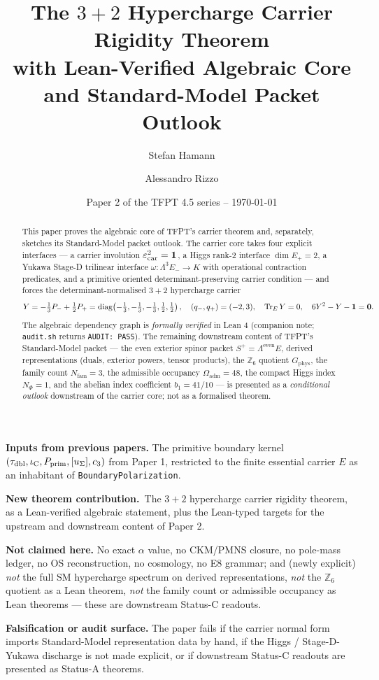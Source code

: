\documentclass[11pt,a4paper]{article}
\title{\color{tfptblue}\textbf{The $3+2$ Hypercharge Carrier Rigidity Theorem}\\[0.35em]
{\Large with Lean-Verified Algebraic Core and Standard-Model Packet Outlook}}
\author{Stefan Hamann \and Alessandro Rizzo}
\date{{\normalsize\color{tfptgray}\sffamily Paper 2 of the TFPT 4.5 series -- \today}}
\begin{document}
\maketitle

\begin{abstract}
This paper proves the algebraic core of TFPT's carrier theorem and, separately, sketches its
Standard-Model packet outlook. The carrier core takes four explicit interfaces --- a carrier
involution $\varepsilon_{\mathrm{car}}^2 = \mathbf 1$, a Higgs rank-$2$ interface $\dim E_+ = 2$, a Yukawa Stage-D
trilinear interface $\omega : \Lambda^3 E_- \to K$ with operational contraction predicates, and a
primitive oriented determinant-preserving carrier condition --- and forces the determinant-normalised
$3+2$ hypercharge carrier
\[
Y = -\tfrac13 P_- + \tfrac12 P_+ = \operatorname{diag}\!\left(-\tfrac13,-\tfrac13,-\tfrac13,\tfrac12,\tfrac12\right),
\quad
(q_-, q_+) = (-2, 3),
\quad
\operatorname{Tr}_E Y = 0,
\quad
6 Y^2 - Y - \mathbf 1 = \mathbf 0.
\]
The algebraic dependency graph is \emph{formally verified} in Lean 4 (companion note;
\texttt{audit.sh} returns \texttt{AUDIT:~PASS}). The remaining downstream content of TFPT's
Standard-Model packet --- the even exterior spinor packet $S^+ = \Lambda^{\mathrm{even}} E$,
derived representations (duals, exterior powers, tensor products), the $\mathbb Z_6$ quotient
$G_{\mathrm{phys}}$, the family count $N_{\mathrm{fam}} = 3$, the admissible occupancy
$\Omega_{\mathrm{adm}} = 48$, the compact Higgs index $N_\Phi = 1$, and the abelian index
coefficient $b_1 = 41/10$ --- is presented as a \emph{conditional outlook} downstream of the
carrier core; not as a formalised theorem.
\end{abstract}

\begin{tfptfrontbox}
\textbf{Inputs from previous papers.} The primitive boundary kernel
$(\tau_{\mathrm{dbl}},\iota_{\mathrm C},P_{\mathrm{prim}},[u_\Sigma],c_3)$ from Paper 1, restricted to the finite essential carrier $E$
as an inhabitant of \texttt{BoundaryPolarization}.

\textbf{New theorem contribution.}\ The $3+2$ hypercharge carrier rigidity theorem, as a
Lean-verified algebraic statement, plus the Lean-typed targets for the upstream and downstream
content of Paper 2.

\textbf{Not claimed here.} No exact $\alpha$ value, no CKM/PMNS closure, no pole-mass ledger, no OS
reconstruction, no cosmology, no E8 grammar; and (newly explicit) \emph{not} the full SM hypercharge
spectrum on derived representations, \emph{not} the $\mathbb Z_6$ quotient as a Lean theorem,
\emph{not} the family count or admissible occupancy as Lean theorems --- these are downstream
Status-C readouts.

\textbf{Falsification or audit surface.} The paper fails if the carrier normal form imports
Standard-Model representation data by hand, if the Higgs / Stage-D-Yukawa discharge is not made
explicit, or if downstream Status-C readouts are presented as Status-A theorems.
\end{tfptfrontbox}
\end{document}
